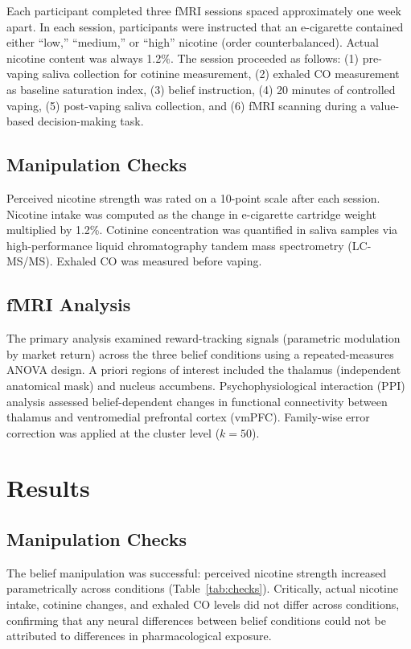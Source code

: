 \documentclass[12pt]{article}
\begin{document}
Each participant completed three fMRI sessions spaced approximately one week apart. In each session, participants were instructed that an e-cigarette contained either ``low,'' ``medium,'' or ``high'' nicotine (order counterbalanced). Actual nicotine content was always 1.2\%. The session proceeded as follows: (1) pre-vaping saliva collection for cotinine measurement, (2) exhaled CO measurement as baseline saturation index, (3) belief instruction, (4) 20 minutes of controlled vaping, (5) post-vaping saliva collection, and (6) fMRI scanning during a value-based decision-making task.

\subsection{Manipulation Checks}

Perceived nicotine strength was rated on a 10-point scale after each session. Nicotine intake was computed as the change in e-cigarette cartridge weight multiplied by 1.2\%. Cotinine concentration was quantified in saliva samples via high-performance liquid chromatography tandem mass spectrometry (LC-MS/MS). Exhaled CO was measured before vaping.

\subsection{fMRI Analysis}

The primary analysis examined reward-tracking signals (parametric modulation by market return) across the three belief conditions using a repeated-measures ANOVA design. A priori regions of interest included the thalamus (independent anatomical mask) and nucleus accumbens. Psychophysiological interaction (PPI) analysis \citep{friston1997psychophysiological} assessed belief-dependent changes in functional connectivity between thalamus and ventromedial prefrontal cortex (vmPFC). Family-wise error correction was applied at the cluster level ($k = 50$).

\section{Results}

\subsection{Manipulation Checks}

The belief manipulation was successful: perceived nicotine strength increased parametrically across conditions (Table~\ref{tab:checks}). Critically, actual nicotine intake, cotinine changes, and exhaled CO levels did not differ across conditions, confirming that any neural differences between belief conditions could not be attributed to differences in pharmacological exposure.
\end{document}
